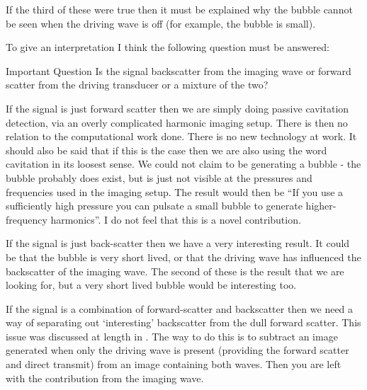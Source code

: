 %
%



If the third of these were true then it must be explained  why the bubble cannot be seen when the driving wave is off (for example, the bubble is small).

To give an interpretation I think the following question must be answered:

\begin{sidetext}{}{Important Question}
  Is the signal backscatter from the imaging wave or forward scatter from the driving transducer or a mixture of the two?
\end{sidetext}
If the signal is just forward scatter then we are simply doing passive cavitation detection,
via an overly complicated harmonic imaging setup.
There is then no relation to the computational work done.
There is no new technology at work.
It should also be said that if this is the case then we are also using the word cavitation in its loosest sense.
We could not claim to be generating a bubble - the bubble probably does exist, but is just not visible at the pressures and frequencies used in the imaging setup.
The result would then be ``If you use a sufficiently high pressure you can pulsate a small bubble  to generate higher-frequency harmonics''.
I do not feel that this is a novel contribution.


If the signal is just back-scatter then we have a very interesting result.
It could be that the bubble is very short lived, or that the driving wave has influenced the backscatter of the imaging wave.
The second of these is the result that we are looking for, but a very short lived bubble would be interesting too.

If the signal is a combination of forward-scatter and backscatter then we need a way of separating out `interesting' backscatter from the dull forward scatter.
This issue was discussed at length in .
The way to do this is to subtract an image generated when only the driving wave is present (providing the forward scatter and direct transmit)
from an image containing both waves.
Then you are left with the contribution from the imaging wave.

